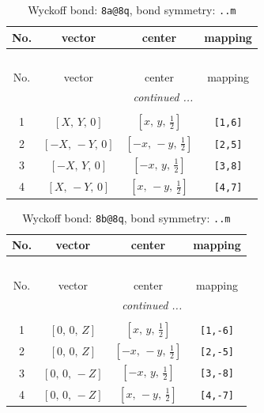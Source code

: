 \documentclass[fleqn,8pt]{jsarticle}
\begin{document}
\begin{longtable}{cccc}
\caption{Wyckoff bond: {\tt 8a@8q}, bond symmetry: {\tt ..m}}
 \\
 \hline \hline
No. & vector & center & mapping \\ \hline \endfirsthead

\multicolumn{3}{l}{\tablename\ \thetable{}} \\
 \hline \hline
No. & vector & center & mapping \\ \hline \endhead

 \hline \hline
\multicolumn{3}{r}{\footnotesize\it continued ...} \\ \endfoot

 \hline \hline
\multicolumn{3}{r}{} \\ \endlastfoot

1 & $\left[ X,\, Y,\, 0 \right]$ & $\left[ x,\, y,\, \frac{1}{2} \right]$ & {\tt [1,6]} \\ \hline
2 & $\left[ - X,\, - Y,\, 0 \right]$ & $\left[ - x,\, - y,\, \frac{1}{2} \right]$ & {\tt [2,5]} \\ \hline
3 & $\left[ - X,\, Y,\, 0 \right]$ & $\left[ - x,\, y,\, \frac{1}{2} \right]$ & {\tt [3,8]} \\ \hline
4 & $\left[ X,\, - Y,\, 0 \right]$ & $\left[ x,\, - y,\, \frac{1}{2} \right]$ & {\tt [4,7]} \\
\end{longtable}
\renewcommand{\arraystretch}{1.2}
\begin{longtable}{cccc}
\caption{Wyckoff bond: {\tt 8b@8q}, bond symmetry: {\tt ..m}}
 \\
 \hline \hline
No. & vector & center & mapping \\ \hline \endfirsthead

\multicolumn{3}{l}{\tablename\ \thetable{}} \\
 \hline \hline
No. & vector & center & mapping \\ \hline \endhead

 \hline \hline
\multicolumn{3}{r}{\footnotesize\it continued ...} \\ \endfoot

 \hline \hline
\multicolumn{3}{r}{} \\ \endlastfoot

1 & $\left[ 0,\, 0,\, Z \right]$ & $\left[ x,\, y,\, \frac{1}{2} \right]$ & {\tt [1,-6]} \\ \hline
2 & $\left[ 0,\, 0,\, Z \right]$ & $\left[ - x,\, - y,\, \frac{1}{2} \right]$ & {\tt [2,-5]} \\ \hline
3 & $\left[ 0,\, 0,\, - Z \right]$ & $\left[ - x,\, y,\, \frac{1}{2} \right]$ & {\tt [3,-8]} \\ \hline
4 & $\left[ 0,\, 0,\, - Z \right]$ & $\left[ x,\, - y,\, \frac{1}{2} \right]$ & {\tt [4,-7]} \\
\end{longtable}
\end{document}
